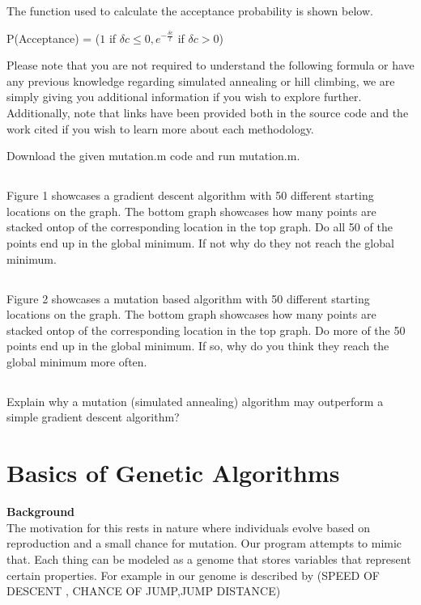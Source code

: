 \documentclass[12]{extarticle}
\begin{document}
The function used to calculate the acceptance probability is shown below\cite{Gnanachandran}.

P(Acceptance) = ($1 $ if $\delta c \leq 0, e^{-\frac{\delta c }{t}} $ if $ \delta c > 0$)

 Please note that you are not required to understand the following formula or have any previous knowledge regarding simulated annealing or hill climbing, we are simply giving you additional information if you wish to explore further. Additionally, note that links have been provided both in the source code and the work cited if you wish to learn more about each methodology.



Download the given mutation.m code and run mutation.m.
\subsection{}
Figure 1 showcases a gradient descent algorithm with 50 different starting locations on the graph. The bottom graph showcases how many points are stacked ontop of the corresponding location in the top graph. Do all 50 of the points end up in the global minimum. If not why do they not reach the global minimum.
\subsection{}
Figure 2 showcases a mutation based algorithm with 50 different starting locations on the graph. The bottom graph showcases how many points are stacked ontop of the corresponding location in the top graph. Do more of the 50 points end up in the global minimum. If so, why do you think they reach the global minimum more often.
\subsection{}
Explain why a mutation (simulated annealing) algorithm may outperform a simple gradient descent algorithm?
\section{Basics of Genetic Algorithms}
\textbf{Background} \\

The motivation for this rests in nature where individuals evolve based on reproduction and a small chance for mutation. Our program attempts to mimic that. Each thing can be modeled as a genome that stores variables that represent certain properties.  For example in our genome is described by
(SPEED OF DESCENT  ,  CHANCE OF JUMP,JUMP DISTANCE)
\end{document}
